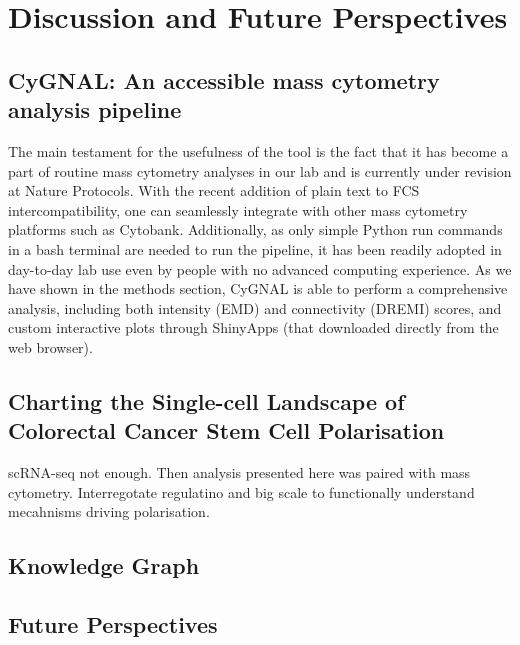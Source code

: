 \chapter{Discussion and Future Perspectives}
\label{07disc}

\section{CyGNAL: An accessible mass cytometry analysis pipeline}

The main testament for the usefulness of the tool is the fact that it has become a part of routine mass cytometry analyses in our lab and is currently under revision at Nature Protocols. With the recent addition of plain text to FCS intercompatibility, one can seamlessly integrate with other mass cytometry platforms such as Cytobank. Additionally, as only simple Python run commands in a bash terminal are needed to run the pipeline, it has been readily adopted in day-to-day lab use even by people with no advanced computing experience. As we have shown in the methods section, CyGNAL is able to perform a comprehensive analysis, including both intensity (EMD) and connectivity (DREMI) scores, and custom interactive plots through ShinyApps (that downloaded directly from the web browser). 

\section{Charting the Single-cell Landscape of Colorectal Cancer Stem Cell Polarisation}



scRNA-seq not enough.
Then analysis presented here was paired with mass cytometry. Interregotate regulatino and big scale to functionally understand mecahnisms driving polarisation.


\section{Knowledge Graph}

\section{Future Perspectives}
